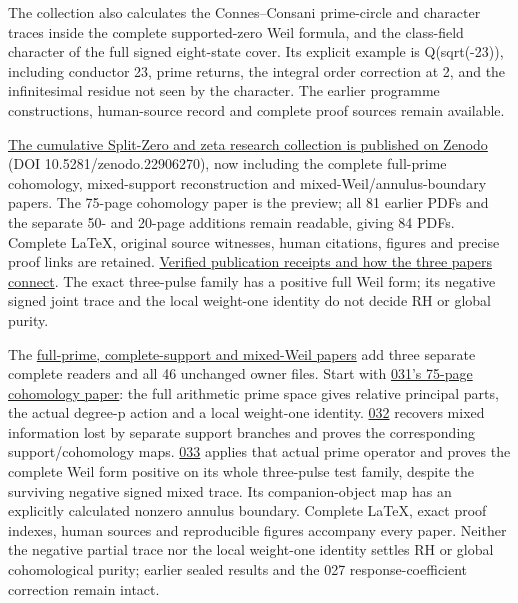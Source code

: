 \documentclass[
]{article}
\begin{document}
The collection also calculates the Connes--Consani prime-circle and
character traces inside the complete supported-zero Weil formula, and
the class-field character of the full signed eight-state cover. Its
explicit example is Q(sqrt(-23)), including conductor 23, prime returns,
the integral order correction at 2, and the infinitesimal residue not
seen by the character. The earlier programme constructions, human-source
record and complete proof sources remain available.

\href{https://zenodo.org/records/22906270}{The cumulative Split-Zero and
zeta research collection is published on Zenodo} (DOI
10.5281/zenodo.22906270), now including the complete full-prime
cohomology, mixed-support reconstruction and mixed-Weil/annulus-boundary
papers. The 75-page cohomology paper is the preview; all 81 earlier PDFs
and the separate 50- and 20-page additions remain readable, giving 84
PDFs. Complete LaTeX, original source witnesses, human citations,
figures and precise proof links are retained.
\href{https://github.com/KokunoYumeto/zeta-function-research-reader/blob/main/workbenches/splitzero-tandem/continuations/20260923-full-prime-support-publication/README.md}{Verified
publication receipts and how the three papers connect}. The exact
three-pulse family has a positive full Weil form; its negative signed
joint trace and the local weight-one identity do not decide RH or global
purity.

The
\href{https://github.com/KokunoYumeto/zeta-function-research-reader/blob/main/workbenches/splitzero-tandem/continuations/20260923-full-prime-support/README.md}{full-prime,
complete-support and mixed-Weil papers} add three separate complete
readers and all 46 unchanged owner files. Start with
\href{https://github.com/KokunoYumeto/zeta-function-research-reader/blob/main/workbenches/splitzero-tandem/continuations/20260923-full-prime-support/031/02_REBUILT_MATHEMATICS.pdf}{031's
75-page cohomology paper}: the full arithmetic prime space gives
relative principal parts, the actual degree-p action and a local
weight-one identity.
\href{https://github.com/KokunoYumeto/zeta-function-research-reader/blob/main/workbenches/splitzero-tandem/continuations/20260923-full-prime-support/032/RECOVERED_PROGRAMME.pdf}{032}
recovers mixed information lost by separate support branches and proves
the corresponding support/cohomology maps.
\href{https://github.com/KokunoYumeto/zeta-function-research-reader/blob/main/workbenches/splitzero-tandem/continuations/20260923-full-prime-support/033/MIXED_PRIME_ENERGY_AND_BOUNDARY.pdf}{033}
applies that actual prime operator and proves the complete Weil form
positive on its whole three-pulse test family, despite the surviving
negative signed mixed trace. Its companion-object map has an explicitly
calculated nonzero annulus boundary. Complete LaTeX, exact proof
indexes, human sources and reproducible figures accompany every paper.
Neither the negative partial trace nor the local weight-one identity
settles RH or global cohomological purity; earlier sealed results and
the 027 response-coefficient correction remain intact.
\end{document}
